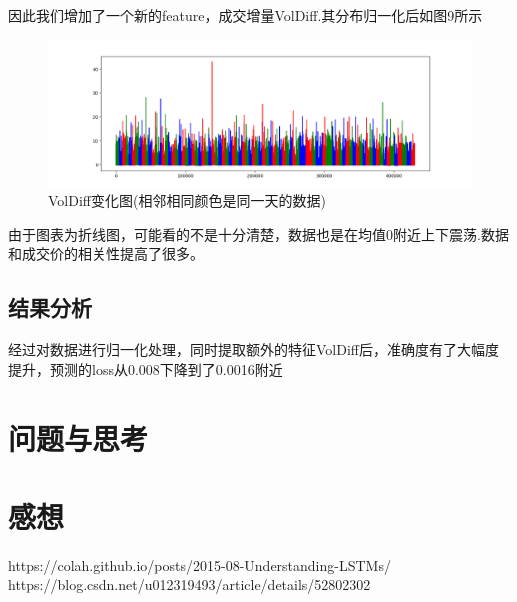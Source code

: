 \documentclass[UTF8]{ctexart}
\begin{document}
\paragraph{}因此我们增加了一个新的feature，成交增量VolDiff.其分布归一化后如图9所示
\begin{figure}[!htbp]
    \centering
    \includegraphics[scale = 0.4]{p9_2.png}
    \caption{VolDiff变化图(相邻相同颜色是同一天的数据)}
\end{figure}
由于图表为折线图，可能看的不是十分清楚，数据也是在均值0附近上下震荡.数据和成交价的相关性提高了很多。
\subsection{结果分析}
经过对数据进行归一化处理，同时提取额外的特征VolDiff后，准确度有了大幅度提升，预测的loss从0.008下降到了0.0016附近
\section{问题与思考}

\section{感想}
\paragraph*{}


\begin{thebibliography}{3}
    https://colah.github.io/posts/2015-08-Understanding-LSTMs/
    https://blog.csdn.net/u012319493/article/details/52802302
    
\end{thebibliography}
\end{document}
